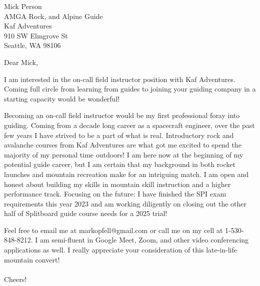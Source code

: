 \documentclass[
	parskip=half, %
	enlargefirstpage=true, %
]{scrlttr2} %
\begin{document}

\begin{letter}{
	Mick Person \\
        AMGA Rock, and Alpine Guide \\
        Kaf Adventures \\
	910 SW Elmgrove St \\
	Seattle, WA 98106
}

\opening{Dear Mick,}

I am interested in the on-call field instructor position with Kaf Adventures.  Coming full circle from learning from guides to joining your guiding company in a starting capacity would be wonderful! 


Becoming an on-call field instructor  would be my first professional foray into guiding.  Coming from a decade long career as a spacecraft engineer, over the past few years I have strived to be a part of what is real.  Introductory rock and avalanche courses from Kaf Adventures are what got me excited to spend the majority of my personal time outdoors! I am here now at the beginning of my potential guide career, but I am certain that my background in both rocket launches and mountain recreation make for an intriguing match.  I am open and honest about building my skills in mountain skill instruction and a higher performance track.  Focusing on the future: I have finished the SPI exam requirements this year  2023 and am working diligently on closing out the other half of Splitboard guide course needs for a 2025 trial!

Feel free to email me at markopfell@gmail.com or call me on my cell at 1-530-848-8212.  I am semi-fluent in Google Meet, Zoom, and other video conferencing applications as well.  I really appreciate your consideration of this late-in-life mountain convert!
\\
\\
Cheers! \\


\end{letter}
\end{document}
